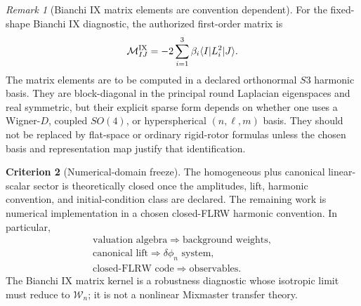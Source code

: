 \documentclass[11pt,a4paper]{article}
\def\Sthree{S3}%
\numberwithin{equation}{section}
\theoremstyle{definition}
\newtheorem{criterion}{Criterion}
\theoremstyle{plain}
\theoremstyle{remark}
\newtheorem{remark}[criterion]{Remark}
\newcommand{\Sthree}{S^3}
\begin{document}
\begin{remark}[Bianchi IX matrix elements are convention dependent]
For the fixed-shape Bianchi IX diagnostic, the authorized first-order matrix is
\begin{equation}
\mathcal M^{\rm IX}_{IJ}=-2\sum_{i=1}^3\beta_i\langle I|L_i^2|J\rangle .
\end{equation}
The matrix elements are to be computed in a declared orthonormal \(\Sthree\) harmonic basis.  They are block-diagonal in the principal round Laplacian eigenspaces and real symmetric, but their explicit sparse form depends on whether one uses a Wigner-\(D\), coupled \(SO(4)\), or hyperspherical \((n,\ell,m)\) basis.  They should not be replaced by flat-space or ordinary rigid-rotor formulas unless the chosen basis and representation map justify that identification.
\end{remark}

\begin{criterion}[Numerical-domain freeze]
The homogeneous plus canonical linear-scalar sector is theoretically closed once the amplitudes, lift, harmonic convention, and initial-condition class are declared.  The remaining work is numerical implementation in a chosen closed-FLRW harmonic convention.  In particular,
\begin{equation}
\boxed{
\begin{array}{c}
\text{valuation algebra}\Rightarrow\text{background weights},\\[1mm]
\text{canonical lift}\Rightarrow\delta\phi_n\text{ system},\\[1mm]
\text{closed-FLRW code}\Rightarrow\text{observables}.
\end{array}}
\end{equation}
The Bianchi IX matrix kernel is a robustness diagnostic whose isotropic limit must reduce to \(\mathscr W_n\); it is not a nonlinear Mixmaster transfer theory.
\end{criterion}
\end{document}
